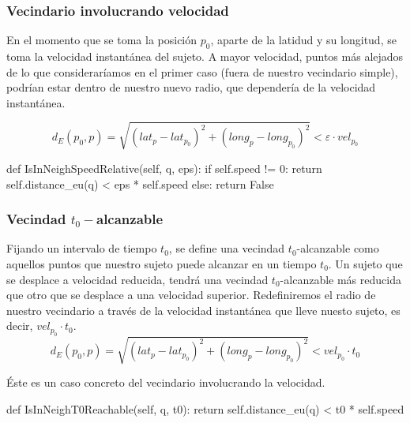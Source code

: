 \documentclass[10pt, spanish]{beamer}
\begin{document}
\begin{frame}[fragile]
\frametitle{Vecindario involucrando velocidad}

En el momento que se toma la posici\'on $p_0$, aparte de la latidud y su longitud, se toma la velocidad instant\'anea del sujeto.
A mayor velocidad, puntos m\'as alejados de lo que considerar\'iamos en el primer caso (fuera de nuestro vecindario simple), podr\'ian estar dentro de nuestro nuevo radio, que depender\'ia de la velocidad instant\'anea.

$$ d_E(p_0, p) = \sqrt{(lat_{p} - lat_{p_0})^2 + (long_{p} - long_{p_0})^2 } < \varepsilon \cdot vel_{p_0} $$

\bigskip
\begin{python}
	def IsInNeighSpeedRelative(self, q, eps):
			if self.speed != 0:
				return self.distance_eu(q) < eps * self.speed	
			else:
				return False
\end{python}

\end{frame}
\begin{frame}[fragile]
\frametitle{Vecindad $t_0-$alcanzable}

Fijando un intervalo de tiempo $t_0$, se define una vecindad $t_0$-alcanzable como aquellos puntos que nuestro sujeto puede alcanzar en un tiempo $t_0$. Un sujeto que se desplace a velocidad reducida, tendr\'a una vecindad $t_0$-alcanzable m\'as reducida que otro que se desplace a una velocidad superior. Redefiniremos el radio de nuestro vecindario a trav\'es de la velocidad instant\'anea que lleve nuesto sujeto, es decir, $vel_{p_0}\cdot t_0$.  \\

$$ d_E(p_0, p) = \sqrt{(lat_{p} - lat_{p_0})^2 + (long_{p} - long_{p_0})^2 } < vel_{p_0} \cdot t_0 $$

\'Este es un caso concreto del vecindario involucrando la velocidad. \\

\bigskip
\begin{python}
        def IsInNeighT0Reachable(self, q, t0):
                return self.distance_eu(q) < t0 * self.speed
\end{python}

\end{frame}
\end{document}
